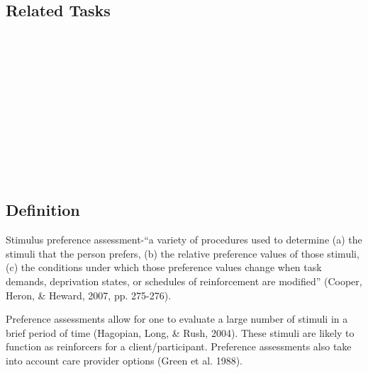 \subsection{Related Tasks}
\fourbOne{}\\ 
\fourgThree{}\\
\fourgFive{}\\
\fouriOne{}\\
\fourjOne{}\\
\fourjFive{}\\
\fourjEight{}\\
\fourjTen{}\\
\fourjThirteen{}\\
\fourFKTen{}\\
%
%
%
%
%
%
%
%
\section[\fouriSeven{}]{\fouriSeven{}%
              }
\subsection{Definition}  
Stimulus preference assessment-``a variety of procedures used to determine (a) the stimuli that the person prefers, (b) the relative preference values of those stimuli, (c) the conditions under which those preference values change when task demands, deprivation states, or schedules of reinforcement are modified''  (Cooper, Heron, \& Heward, 2007, pp. 275-276).

Preference assessments allow for one to evaluate a large number of stimuli in a brief period of time (Hagopian, Long, \& Rush, 2004). These stimuli are likely to function as reinforcers for a client/participant. Preference assessments also take into account care provider options (Green et al. 1988).   
%
